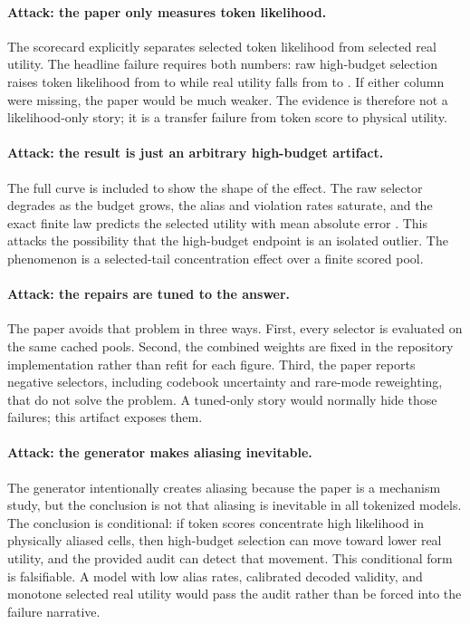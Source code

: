 \paragraph{Attack: the paper only measures token likelihood.}
The scorecard explicitly separates selected token likelihood from selected real utility. The headline failure requires both numbers: raw high-budget selection raises token likelihood from \VThreeRawTokenNOne{} to \VThreeRawTokenHigh{} while real utility falls from \VThreeRawRealNOne{} to \VThreeRawRealHigh{}. If either column were missing, the paper would be much weaker. The evidence is therefore not a likelihood-only story; it is a transfer failure from token score to physical utility.

\paragraph{Attack: the result is just an arbitrary high-budget artifact.}
The full curve is included to show the shape of the effect. The raw selector degrades as the budget grows, the alias and violation rates saturate, and the exact finite law predicts the selected utility with mean absolute error \VThreeLawMae{}. This attacks the possibility that the high-budget endpoint is an isolated outlier. The phenomenon is a selected-tail concentration effect over a finite scored pool.

\paragraph{Attack: the repairs are tuned to the answer.}
The paper avoids that problem in three ways. First, every selector is evaluated on the same cached pools. Second, the combined weights are fixed in the repository implementation rather than refit for each figure. Third, the paper reports negative selectors, including codebook uncertainty and rare-mode reweighting, that do not solve the problem. A tuned-only story would normally hide those failures; this artifact exposes them.

\paragraph{Attack: the generator makes aliasing inevitable.}
The generator intentionally creates aliasing because the paper is a mechanism study, but the conclusion is not that aliasing is inevitable in all tokenized models. The conclusion is conditional: if token scores concentrate high likelihood in physically aliased cells, then high-budget selection can move toward lower real utility, and the provided audit can detect that movement. This conditional form is falsifiable. A model with low alias rates, calibrated decoded validity, and monotone selected real utility would pass the audit rather than be forced into the failure narrative.

